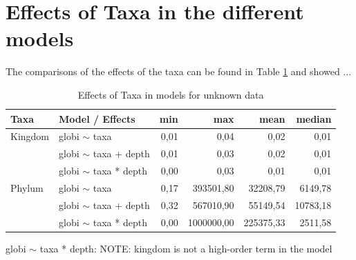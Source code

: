   \section{Effects of Taxa in the different models}

    The comparisons of the effects of the taxa can be found in Table \ref{table:Effects unknown data} 
    and showed ...

    \begin{table}[h!]
      \begin{center}
        \begin{tabular}{ |l|l|r|r|r|r| }
          \hline
          \bfseries Taxa & \bfseries Model / Effects & \bfseries min & \bfseries max & \bfseries mean & \bfseries median \\
          \hline \hline
          Kingdom & globi $\sim$ taxa         & 0,01 & 0,04 & 0,02 & 0,01 \\
                  & globi $\sim$ taxa + depth & 0,01 & 0,03 & 0,02 & 0,01 \\
                  & globi $\sim$ taxa * depth & 0,00 & 0,03 & 0,01 & 0,01 \\
          \hline
          Phylum & globi $\sim$ taxa          & 0,17 & 393501,80 & 32208,79 & 6149,78 \\
                  & globi $\sim$ taxa + depth & 0,32 & 567010,90 & 55149,54 & 10783,18 \\
                  & globi $\sim$ taxa * depth & 0,00 & 1000000,00 & 225375,33 & 2511,58 \\
          \hline
        \end{tabular} 
      \end{center}
      \caption{Effects of Taxa in models for unknown data}
      \label{table:Effects unknown data} 
    \end{table}

    globi $\sim$ taxa * depth: NOTE: kingdom is not a high-order term in the model


